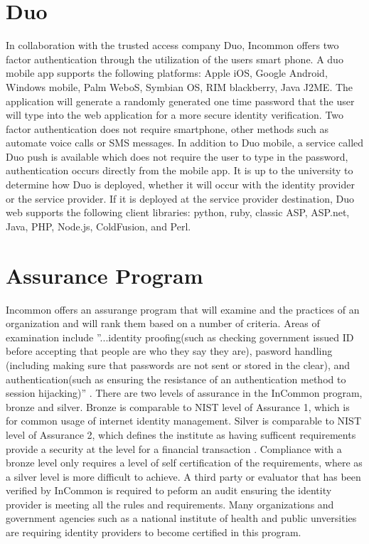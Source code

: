 \documentclass[9pt,twocolumn,twoside]{../../styles/osajnl}
\begin{document}
\section{Duo}

In collaboration with the trusted access company Duo, Incommon offers
two factor authentication through the utilization of the users smart
phone\cite{www-duo}.  A duo mobile app supports the following
platforms: Apple iOS, Google Android, Windows mobile, Palm WeboS,
Symbian OS, RIM blackberry, Java J2ME.  The application will generate
a randomly generated one time password that the user will type into
the web application for a more secure identity verification.  Two
factor authentication does not require smartphone, other methods such
as automate voice calls or SMS messages.  In addition to Duo mobile, a
service called Duo push is available which does not require the user
to type in the password, authentication occurs directly from the
mobile app.  It is up to the university to determine how Duo is
deployed, whether it will occur with the identity provider or the
service provider.  If it is deployed at the service provider
destination, Duo web supports the following client libraries: python,
ruby, classic ASP, ASP.net, Java, PHP, Node.js, ColdFusion, and Perl.

\section{Assurance Program}

Incommon offers an assurange program that will examine and the
practices of an organization and will rank them based on a number of
criteria.  Areas of examination include ''...identity proofing(such as
checking government issued ID before accepting that people are who
they say they are), pasword handling (including making sure that
passwords are not sent or stored in the clear), and
authentication(such as ensuring the resistance of an authentication
method to session hijacking)'' \cite{www-harvard}.  There are two
levels of assurance in the InCommon program, bronze and silver.
Bronze is comparable to NIST level of Assurance 1, which is for common
usage of internet identity management.  Silver is comparable to NIST
level of Assurance 2, which defines the institute as having sufficent
requirements provide a security at the level for a financial
transaction \cite{www-levels}.  Compliance with a bronze level only
requires a level of self certification of the requirements, where as a
silver level is more difficult to achieve.  A third party or evaluator
that has been verified by InCommon is required to peform an audit
ensuring the identity provider is meeting all the rules and
requirements.  Many organizations and government agencies such as a
national institute of health and public unversities are requiring
identity providers to become certified in this program.
\end{document}
